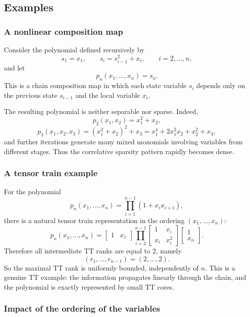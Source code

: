 \documentclass[11pt,a4paper]{article}
\theoremstyle{definition}
\begin{document}
\subsection{Examples}

\subsubsection{A nonlinear composition map}

Consider the polynomial defined recursively by
\[
s_1=x_1,
\qquad
s_i=s_{i-1}^2+x_i,
\qquad i=2,\dots,n,
\]
and let
\[
p_n(x_1,\dots,x_n)=s_n.
\]
This is a chain composition map in which each state variable \(s_i\) depends only on the previous state \(s_{i-1}\) and the local variable \(x_i\).

The resulting polynomial is neither separable nor sparse. Indeed,
\[
p_2(x_1,x_2)=x_1^2+x_2,
\]
\[
p_3(x_1,x_2,x_3)=(x_1^2+x_2)^2+x_3
= x_1^4+2x_1^2x_2+x_2^2+x_3,
\]
and further iterations generate many mixed monomials involving variables from different stages. Thus the correlative sparsity pattern rapidly becomes dense.

\subsubsection{A tensor train example}

For the polynomial
\[
p_n(x_1,\dots,x_n)=\prod_{i=1}^{n-1}(1+x_i x_{i+1}),
\]
there is a natural tensor train representation in the ordering \((x_1,\dots,x_n)\):
\[
p_n(x_1,\dots,x_n)
=
\begin{bmatrix}1 & x_1\end{bmatrix}
\prod_{i=2}^{n-1}
\begin{bmatrix}
1 & x_i\\
x_i & x_i^2
\end{bmatrix}
\begin{bmatrix}
1\\
x_n
\end{bmatrix}.
\]
Therefore all intermediate TT ranks are equal to \(2\), namely
\[
(r_1,\dots,r_{n-1})=(2,\dots,2).
\]
So the maximal TT rank is uniformly bounded, independently of \(n\). This is a genuine TT example: the information propagates linearly through the chain, and the polynomial is exactly represented by small TT cores.


\subsubsection{Impact of the ordering of the variables}
\end{document}
